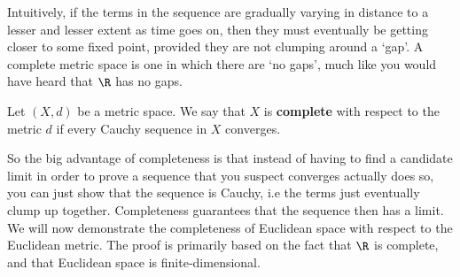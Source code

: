 Intuitively, if the terms in the sequence are gradually varying in distance to a lesser and lesser extent as time goes on, then they must eventually be getting closer to some fixed point, provided they are not clumping around a `gap'. A complete metric space is one in which there are `no gaps', much like you would have heard that \( \R \) has no gaps.

\begin{definition}
  Let \( (X,d) \) be a metric space. We say that \( X \) is \textbf{complete} with respect to the metric \( d \) if every Cauchy sequence in \( X \) converges.
\end{definition}

So the big advantage of completeness is that instead of having to find a candidate limit in order to prove a sequence that you suspect converges actually does so, you can just show that the sequence is Cauchy, i.e the terms just eventually clump up together. Completeness guarantees that the sequence then has a limit. We will now demonstrate the completeness of Euclidean space with respect to the Euclidean metric. The proof is primarily based on the fact that \( \R \) is complete, and that Euclidean space is finite-dimensional.

